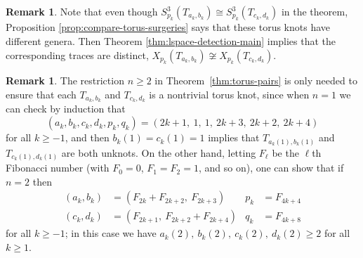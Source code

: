 \documentclass[11pt]{amsart}
\numberwithin{equation}{section}
\numberwithin{theorem}{section}
\theoremstyle{definition}
\newtheorem{remark}[theorem]{Remark}
\begin{document}
\begin{remark}
Note that even though $S^3_{p_k}(T_{a_k,b_k}) \cong S^3_{p_k}(T_{c_k,d_k})$ in the theorem, Proposition \ref{prop:compare-torus-surgeries} says that these torus knots have different genera. Then Theorem \ref{thm:lspace-detection-main} implies that the corresponding traces are distinct, $X_{p_k}(T_{a_k,b_k}) \not\cong X_{p_k}(T_{c_k,d_k})$.
\end{remark}

\begin{remark}
The restriction $n\geq 2$ in Theorem~\ref{thm:torus-pairs} is only needed to ensure that each $T_{a_k,b_k}$ and $T_{c_k,d_k}$ is a nontrivial torus knot, since when $n=1$ we can check by induction that
\[ (a_k,b_k,c_k,d_k,p_k,q_k) = (2k+1,\ 1,\ 1,\ 2k+3,\ 2k+2,\ 2k+4) \]
for all $k \geq -1$, and then $b_k(1) = c_k(1) = 1$ implies that $T_{a_k(1),b_k(1)}$ and $T_{c_k(1),d_k(1)}$ are both unknots.  On the other hand, letting $F_\ell$ be the $\ell$th Fibonacci number (with $F_0=0$, $F_1=F_2=1$, and so on), one can show that if $n=2$ then
\begin{align*}
(a_k,b_k) &= (F_{2k}+F_{2k+2},\ F_{2k+3}) &
p_k &= F_{4k+4} \\
(c_k,d_k) &= (F_{2k+1},\ F_{2k+2}+F_{2k+4}) &
q_k &= F_{4k+8}
\end{align*}
for all $k\geq -1$; in this case we have $a_k(2),\ b_k(2),\ c_k(2),\ d_k(2) \geq 2$ for all $k\geq 1$.
\end{remark}
\end{document}
